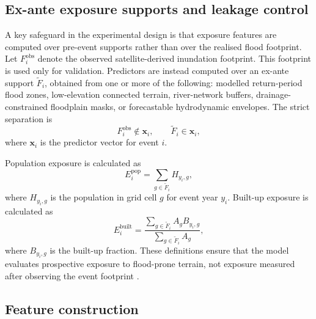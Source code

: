 \documentclass[pdflatex,sn-mathphys-ay]{sn-jnl}
\theoremstyle{thmstyleone}
\begin{document}
\begin{appendices}
\subsection{Ex-ante exposure supports and leakage control}
\label{app:leakage_control}

A key safeguard in the experimental design is that exposure features
are computed over pre-event supports rather than over the realised
flood footprint.  Let $F^{\mathrm{obs}}_i$ denote the observed
satellite-derived inundation footprint.  This footprint is used only
for validation.  Predictors are instead computed over an ex-ante
support $\widetilde{F}_i$, obtained from one or more of the following:
modelled return-period flood zones, low-elevation connected terrain,
river-network buffers, drainage-constrained floodplain masks, or
forecastable hydrodynamic envelopes.  The strict separation is
\begin{equation}
  F^{\mathrm{obs}}_i
  \notin
  \mathbf{x}_{i},
  \qquad
  \widetilde{F}_i
  \in
  \mathbf{x}_{i},
  \label{eq:app_leakage_rule}
\end{equation}
where $\mathbf{x}_{i}$ is the predictor vector for event $i$.

Population exposure is calculated as
\begin{equation}
  E^{\mathrm{pop}}_{i}
  =
  \sum_{g\in\widetilde{F}_{i}}
  H_{y_i,g},
  \label{eq:app_pop_exposure}
\end{equation}
where $H_{y_i,g}$ is the population in grid cell $g$ for event year
$y_i$.  Built-up exposure is calculated as
\begin{equation}
  E^{\mathrm{built}}_{i}
  =
  \frac{
    \displaystyle
    \sum_{g\in\widetilde{F}_{i}}
    A_g B_{y_i,g}
  }{
    \displaystyle
    \sum_{g\in\widetilde{F}_{i}} A_g
  },
  \label{eq:app_built_exposure}
\end{equation}
where $B_{y_i,g}$ is the built-up fraction.  These definitions ensure
that the model evaluates prospective exposure to flood-prone terrain,
not exposure measured after observing the event footprint
\citep{Qiang2017,Andreadis2022,Rentschler2022}.

\subsection{Feature construction}
\label{app:feature_construction}


\end{appendices}
\end{document}
